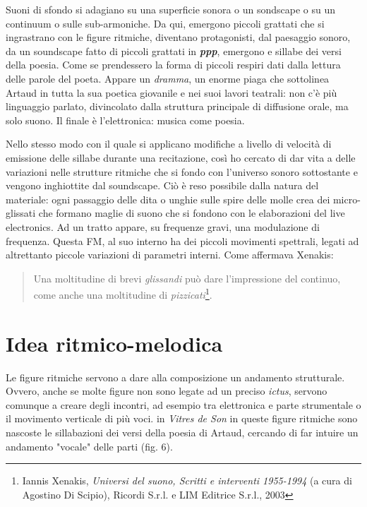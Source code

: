 Suoni di sfondo si adagiano su una superficie sonora o un sondscape o su un continuum o sulle sub-armoniche. Da qui, emergono piccoli grattati che si ingrastrano con le figure ritmiche, diventano protagonisti, dal paesaggio sonoro, da un soundscape fatto di piccoli grattati in \textbf{\textit{ppp}}, emergono e sillabe dei versi della poesia. Come se prendessero la forma di piccoli respiri dati dalla lettura delle parole del poeta. Appare un \textit{dramma}, un enorme piaga che sottolinea Artaud in tutta la sua poetica giovanile e nei suoi lavori teatrali: non c'è più linguaggio parlato, divincolato dalla struttura principale di diffusione orale, ma solo suono. Il finale è l'elettronica: musica come poesia.

Nello stesso modo con il quale si applicano modifiche a livello di velocità di emissione delle sillabe durante una recitazione, così ho cercato di dar vita a delle variazioni nelle strutture ritmiche che si fondo con l'universo sonoro sottostante e vengono inghiottite dal soundscape. Ciò è reso possibile dalla natura del materiale: ogni passaggio delle dita o unghie sulle spire delle molle crea dei micro-glissati che formano maglie di suono che si fondono con le elaborazioni del live electronics. Ad un tratto appare, su frequenze gravi, una modulazione di frequenza. Questa FM, al suo interno ha dei piccoli movimenti spettrali, legati ad altrettanto piccole variazioni di parametri interni. Come affermava Xenakis:

\begin{quotation}
Una moltitudine di brevi \textit{glissandi} può dare l'impressione del continuo, come anche una moltitudine di \textit{pizzicati}\footnote{Iannis Xenakis, \textit{Universi del suono, Scritti e interventi 1955-1994} (a cura di Agostino Di Scipio), Ricordi S.r.l. e LIM Editrice S.r.l., 2003}.
\end{quotation}

\section{Idea ritmico-melodica}

Le figure ritmiche servono a dare alla composizione un andamento strutturale. Ovvero, anche se molte figure non sono legate ad un preciso \textit{ictus}, servono comunque a creare degli incontri, ad esempio tra elettronica e parte strumentale o il movimento verticale di più voci. in \textit{Vitres de Son} in queste figure ritmiche sono nascoste le sillabazioni dei versi della poesia di Artaud, cercando di far intuire un andamento "vocale" delle parti (fig. 6).

